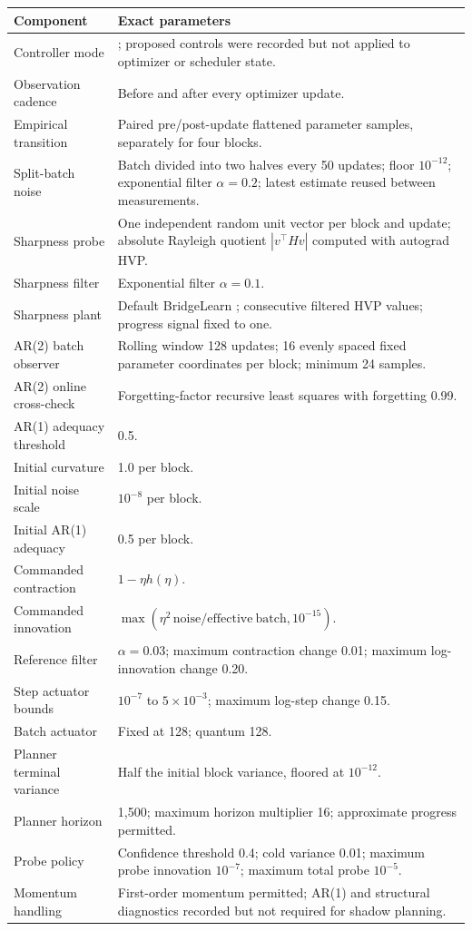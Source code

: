 \documentclass[10pt,letterpaper]{article}
\newcommand{\code}[1]{\texttt{\detokenize{#1}}}
\begin{document}
\begin{longtable}{p{}p{}}
\toprule
Component & Exact parameters \\
\midrule
\endhead
Controller mode & \code{shadow}; proposed controls were recorded but not
applied to optimizer or scheduler state. \\
Observation cadence & Before and after every optimizer update. \\
Empirical transition & Paired pre/post-update flattened parameter samples,
separately for four blocks. \\
Split-batch noise & Batch divided into two halves every 50 updates; floor
$10^{-12}$; exponential filter $\alpha=0.2$; latest estimate reused between
measurements. \\
Sharpness probe & One independent random unit vector per block and update;
absolute Rayleigh quotient $|v^\top H v|$ computed with autograd HVP. \\
Sharpness filter & Exponential filter $\alpha=0.1$. \\
Sharpness plant & Default BridgeLearn \code{SharpnessPlant}; consecutive
filtered HVP values; progress signal fixed to one. \\
AR(2) batch observer & Rolling window 128 updates; 16 evenly spaced fixed
parameter coordinates per block; minimum 24 samples. \\
AR(2) online cross-check & Forgetting-factor recursive least squares with
forgetting 0.99. \\
AR(1) adequacy threshold & 0.5. \\
Initial curvature & 1.0 per block. \\
Initial noise scale & $10^{-8}$ per block. \\
Initial AR(1) adequacy & 0.5 per block. \\
Commanded contraction & $1-\eta h(\eta)$. \\
Commanded innovation &
$\max(\eta^2\,\mathrm{noise}/\mathrm{effective\ batch},10^{-15})$. \\
Reference filter & $\alpha=0.03$; maximum contraction change 0.01; maximum
log-innovation change 0.20. \\
Step actuator bounds & $10^{-7}$ to $5\times10^{-3}$; maximum log-step change
0.15. \\
Batch actuator & Fixed at 128; quantum 128. \\
Planner terminal variance & Half the initial block variance, floored at
$10^{-12}$. \\
Planner horizon & 1,500; maximum horizon multiplier 16; approximate progress
permitted. \\
Probe policy & Confidence threshold 0.4; cold variance 0.01; maximum probe
innovation $10^{-7}$; maximum total probe $10^{-5}$. \\
Momentum handling & First-order momentum permitted; AR(1) and structural
diagnostics recorded but not required for shadow planning. \\
\bottomrule
\end{longtable}
\end{document}
